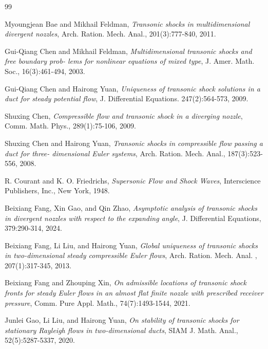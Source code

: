 \documentclass[reqno,12pt]{amsart}
\numberwithin{equation}{section}
\begin{document}
\begin{thebibliography}{99}

 Myoungjean Bae and Mikhail Feldman,
\newblock  \emph{Transonic shocks in multidimensional divergent nozzles},
\newblock Arch. Ration. Mech. Anal., 201(3):777-840, 2011.

 Gui-Qiang Chen and Mikhail Feldman,
\newblock  \emph{Multidimensional transonic shocks and free boundary prob- lems for nonlinear equations of mixed type},
\newblock J. Amer. Math. Soc., 16(3):461-494, 2003.

  Gui-Qiang Chen and Hairong Yuan,
\newblock  \emph{Uniqueness of transonic shock solutions in a duct for steady potential flow},
\newblock J. Differential Equations. 247(2):564-573, 2009.

 Shuxing Chen,
\newblock  \emph{Compressible flow and transonic shock in a diverging nozzle},
\newblock Comm. Math. Phys., 289(1):75-106, 2009.

 Shuxing Chen and Hairong Yuan,
\newblock  \emph{Transonic shocks in compressible flow passing a duct for three- dimensional Euler systems},
\newblock Arch. Ration. Mech. Anal., 187(3):523-556, 2008.

 R. Courant and K. O. Friedrichs,
\newblock  \emph{Supersonic Flow  and Shock  Waves},
\newblock Interscience Publishers, Inc., New York, 1948.

  Beixiang Fang, Xin Gao, and Qin Zhao,
\newblock  \emph{Asymptotic analysis of transonic shocks in divergent nozzles with respect to the expanding angle},
\newblock J. Differential Equations, 379:290-314, 2024.

 Beixiang Fang, Li Liu, and Hairong Yuan,
\newblock  \emph{Global uniqueness of transonic shocks in two-dimensional steady compressible Euler flows},
\newblock Arch. Ration. Mech. Anal. , 207(1):317-345, 2013.

 Beixiang Fang and Zhouping Xin,
\newblock  \emph{On admissible locations of transonic shock fronts for steady Euler flows in an almost flat finite nozzle with prescribed receiver pressure},
\newblock Comm. Pure Appl. Math., 74(7):1493-1544, 2021.

 Junlei Gao, Li Liu, and Hairong Yuan,
\newblock  \emph{On stability of transonic shocks for stationary Rayleigh flows in two-dimensional ducts},
\newblock SIAM J. Math. Anal., 52(5):5287-5337, 2020.


\end{thebibliography}
\end{document}

